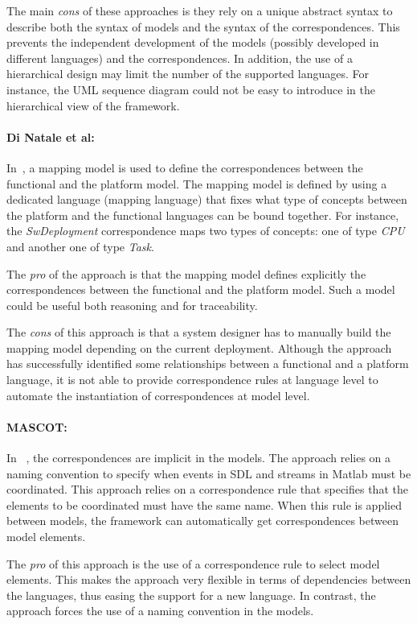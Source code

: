 The main \emph{cons} of these approaches is they rely on a unique abstract syntax to describe both the syntax of models and the syntax of the correspondences. This prevents the independent development of the models (possibly developed in different languages) and the correspondences. In addition, the use of a hierarchical design may limit the number of the supported languages. For instance, the UML sequence diagram could not be easy to introduce in the hierarchical view of the framework.

\paragraph{Di Natale et al: }
In~\cite{dinatale}, a mapping model is used to define the correspondences between the functional and the platform model. The mapping model is defined by using a dedicated language (\ie mapping language) that fixes what type of concepts between the platform and the functional languages can be bound together. For instance, the \emph{SwDeployment} correspondence maps two types of concepts: one of type \emph{CPU} and another one of type \emph{Task}. 

The \emph{pro} of the approach is that the mapping model defines explicitly the correspondences between the functional and the platform model. Such a model could be useful both reasoning and for traceability. 

The \emph{cons} of this approach is that a system designer has to manually build the mapping model depending on the current deployment. Although the approach has successfully identified some relationships between a functional and a platform language, it is not able to provide correspondence rules at language level to automate the instantiation of correspondences at model level. 

\paragraph{MASCOT: }
In ~\cite{mascotbib}, the correspondences are implicit in the models. The approach relies on a naming convention to specify when events in SDL and streams in Matlab must be coordinated. This approach relies on a correspondence rule that specifies that the elements to be coordinated must have the same name. When this rule is applied between models, the framework can automatically get correspondences between model elements.

The \emph{pro} of this approach is the use of a correspondence rule to select model elements. This makes the approach very flexible in terms of dependencies between the languages, thus easing the support for a new language. In contrast, the approach forces the use of a naming convention in the models.     


